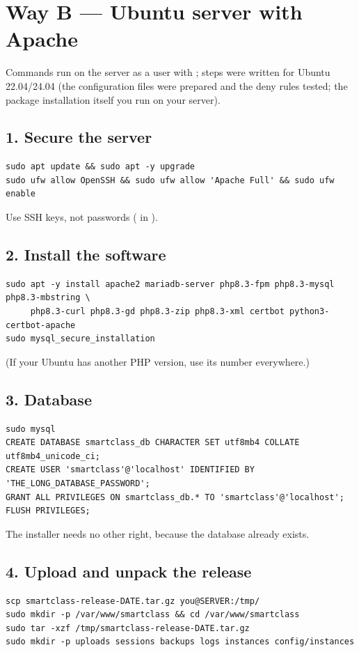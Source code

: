 \documentclass[11pt,a4paper]{article}
\begin{document}
\section{Way B --- Ubuntu server with Apache}
Commands run on the server as a user with ; steps were written for Ubuntu 22.04/24.04 (the configuration files were prepared and the deny rules tested; the package installation itself you run on your server).
\subsection{1. Secure the server}
\begin{lstlisting}
sudo apt update && sudo apt -y upgrade
sudo ufw allow OpenSSH && sudo ufw allow 'Apache Full' && sudo ufw enable
\end{lstlisting}
Use SSH keys, not passwords ( in ).
\subsection{2. Install the software}
\begin{lstlisting}
sudo apt -y install apache2 mariadb-server php8.3-fpm php8.3-mysql php8.3-mbstring \
     php8.3-curl php8.3-gd php8.3-zip php8.3-xml certbot python3-certbot-apache
sudo mysql_secure_installation
\end{lstlisting}
(If your Ubuntu has another PHP version, use its number everywhere.)
\subsection{3. Database}
\begin{lstlisting}
sudo mysql
CREATE DATABASE smartclass_db CHARACTER SET utf8mb4 COLLATE utf8mb4_unicode_ci;
CREATE USER 'smartclass'@'localhost' IDENTIFIED BY 'THE_LONG_DATABASE_PASSWORD';
GRANT ALL PRIVILEGES ON smartclass_db.* TO 'smartclass'@'localhost';
FLUSH PRIVILEGES;
\end{lstlisting}
The installer needs no other right, because the database already exists.
\subsection{4. Upload and unpack the release}
\begin{lstlisting}
scp smartclass-release-DATE.tar.gz you@SERVER:/tmp/
sudo mkdir -p /var/www/smartclass && cd /var/www/smartclass
sudo tar -xzf /tmp/smartclass-release-DATE.tar.gz
sudo mkdir -p uploads sessions backups logs instances config/instances
\end{lstlisting}
\end{document}
